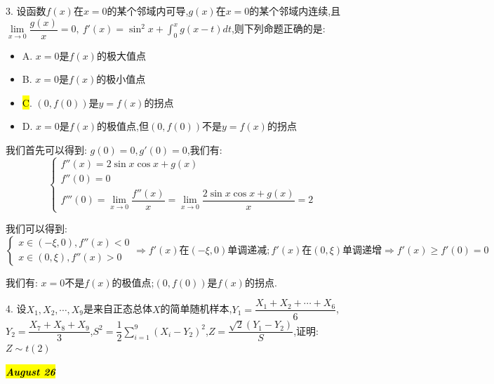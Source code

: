 3. 设函数$f(x)$在$x=0$的某个邻域内可导,$g(x)$在$x=0$的某个邻域内连续,且$\lim\limits_{x\rightarrow 0}\dfrac{g(x)}{x}=0,\ f'(x)=\sin^2 x+\int_{0}^{x}g(x-t)dt$,则下列命题正确的是:  
\begin{itemize}
	\item A. $x=0$是$f(x)$的极大值点
	\item B. $x=0$是$f(x)$的极小值点
	\item \hl{C}. $(0,f(0))$是$y=f(x)$的拐点
	\item D. $x=0$是$f(x)$的极值点,但$(0,f(0))$不是$y=f(x)$的拐点
\end{itemize}
\begin{solution}

	我们首先可以得到:  $g(0)=0,g'(0)=0$,我们有:  
	$$\left\lbrace
	\begin{array}{l}
		f''(x)=2\sin x\cos x+g(x)\\
		f''(0)=0\\
		f'''(0)=\lim\limits_{x\rightarrow 0}\dfrac{f''(x)}{x}=\lim\limits_{x\rightarrow 0}\dfrac{2\sin x\cos x+g(x)}{x}=2
	\end{array}
	\right. $$
	
	我们可以得到:  $$\left\lbrace
	\begin{array}{l}
		x\in(-\xi,0),f''(x)<0\\
		x\in(0,\xi),f''(x)>0
	\end{array}
	\right. \Rightarrow f'(x)\text{在}(-\xi,0)\text{单调递减};f'(x)\text{在}(0,\xi)\text{单调递增}\Rightarrow f'(x)\geq f'(0)=0$$
	
	我们有:  $x=0$不是$f(x)$的极值点;$(0,f(0))$是$f(x)$的拐点.
\end{solution}

4. 设$X_{1},X_{2},\cdots,X_{9}$是来自正态总体$X$的简单随机样本,$Y_{1}=\dfrac{X_{1}+X_{2}+\cdots+X_{6}}{6}$,$Y_{2}=\dfrac{X_{7}+X_{8}+X_{9}}{3}$,$S^2=\dfrac{1}{2}\sum\limits_{i=1}^{9}(X_{i}-Y_{2})^2$,$Z=\dfrac{\sqrt{2}(Y_{1}-Y_{2})}{S}$,证明:  $Z\sim t(2)$
\begin{solution}
	
\end{solution}

\hl{\textbf{\textit{August 26}}}

